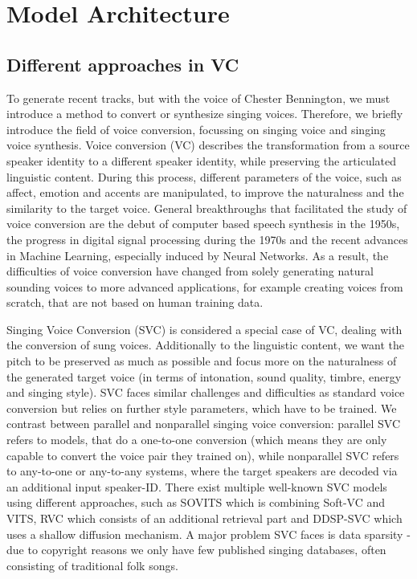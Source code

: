 \documentclass[a4paper]{article}
\begin{document}
	\newpage
	
	\section{Model Architecture}
	
	\subsection{Different approaches in VC}
	
	To generate recent tracks, but with the voice of Chester Bennington, we must introduce a method to convert or synthesize singing voices. Therefore, we briefly introduce the field of voice conversion, focussing on singing voice and singing voice synthesis. Voice conversion (VC) describes the transformation from a source speaker identity to a different speaker identity, while preserving the articulated linguistic content. During this process, different parameters of the voice, such as affect, emotion and accents are manipulated, to improve the naturalness and the similarity to the target voice. General breakthroughs that facilitated the study of voice conversion are the debut of computer based speech synthesis in the 1950s, the progress in digital signal processing during the 1970s and the recent advances in Machine Learning, especially induced by Neural Networks. \cite{Sisman2020} As a result, the difficulties of voice conversion have changed from solely generating natural sounding voices to more advanced applications, for example creating voices from scratch, that are not based on human training data. 
	
	Singing Voice Conversion (SVC) is considered a special case of VC, dealing with the conversion of sung voices. Additionally to the linguistic content, we want the pitch to be preserved as much as possible and focus more on the naturalness of the generated target voice (in terms of intonation, sound quality, timbre, energy and singing style). SVC faces similar challenges and difficulties as standard voice conversion but relies on further style parameters, which have to be trained. We contrast between parallel and nonparallel singing voice conversion: parallel SVC refers to models, that do a one-to-one conversion (which means they are only capable to convert the voice pair they trained on), while nonparallel SVC refers to any-to-one or any-to-any systems, where the target speakers are decoded via an additional input speaker-ID. There exist multiple well-known SVC models using different approaches, such as SOVITS which is combining Soft-VC and VITS, RVC which consists of an additional retrieval part and DDSP-SVC which uses a shallow diffusion mechanism. \cite{MediumSVC2023} A major problem SVC faces is data sparsity - due to copyright reasons we only have few published singing databases, often consisting of traditional folk songs.
	
\end{document}
